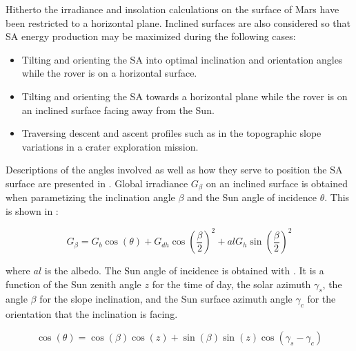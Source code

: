 Hitherto the irradiance and insolation calculations on the surface of Mars have been restricted to a horizontal plane. Inclined surfaces are also considered so that \ac{SA} energy production may be maximized during the following cases:
\begin{itemize}
    \item Tilting and orienting the \ac{SA} into optimal inclination and orientation angles while the rover is on a horizontal surface.
    \item Tilting and orienting the \ac{SA} towards a horizontal plane while the rover is on an inclined surface facing away from the Sun.
    \item Traversing descent and ascent profiles such as in the topographic slope variations in a crater exploration mission.
\end{itemize}

\clearpage
Descriptions of the angles involved as well as how they serve to position the \ac{SA} surface are presented in . Global irradiance $G_{\beta}$ on an inclined surface is obtained when parametizing the inclination angle $\beta$ and the Sun angle of incidence $\theta$. This is shown in :

\begin{equation}
  \label{eq:G_beta}
  G_{\beta} = G_{b}\cos{(\theta)} + G_{dh}\cos{\left(\frac{\beta}{2}\right)}^2 + al G_{h} \sin{\left(\frac{\beta}{2}\right)}^2
\end{equation}

where $al$ is the albedo. The Sun angle of incidence is obtained with . It is a function of the Sun zenith angle $z$ for the time of day, the solar azimuth $\gamma_{s}$, the angle $\beta$ for the slope inclination, and the Sun surface azimuth angle $\gamma_{c}$ for the orientation that the inclination is facing.

\begin{equation}
  \label{eq:costheta}
  \cos{(\theta)} = \cos{(\beta)}\cos{(z)} + \sin{(\beta)}\sin{(z)}\cos{(\gamma_{s} - \gamma_{c})}
\end{equation}

